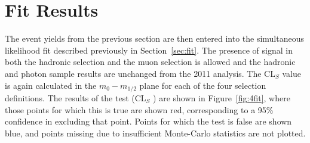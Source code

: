 \section{Fit Results}

The event yields from the previous section are then entered into the simultaneous likelihood fit described previously in Section~\ref{sec:fit}. The presence of signal in both the hadronic selection and the muon selection is allowed and the hadronic and photon sample results are unchanged from the 2011 analysis. The CL$_{S}$ value is again calculated in the $m_{0}-m_{1/2}$ plane for each of the four selection definitions. The results of the test (CL$_{S}$ ) are shown in Figure~\ref{fig:4fit}, where those points for which this is true are shown red, corresponding to a 95\% confidence in excluding that point. Points for which the test is false are shown blue, and points missing due to insufficient Monte-Carlo statistics are not plotted. 



